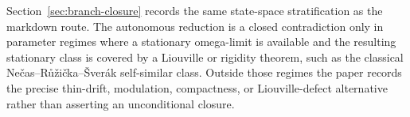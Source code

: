 \documentclass[11pt]{amsart}
\theoremstyle{plain}
\theoremstyle{definition}
\theoremstyle{remark}
\begin{document}
Section~\ref{sec:branch-closure} records the same state-space stratification as the markdown
route.  The autonomous reduction is a closed contradiction only in parameter regimes where a
stationary omega-limit is available and the resulting stationary class is covered by a Liouville
or rigidity theorem, such as the classical Nečas--Růžička--Šverák self-similar class.  Outside
those regimes the paper records the precise thin-drift, modulation, compactness, or
Liouville-defect alternative rather than asserting an unconditional closure.
\end{document}
